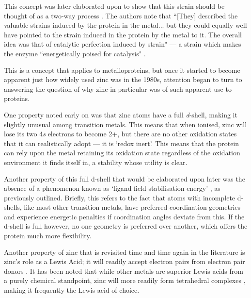 This concept was later elaborated upon to show that this strain should be thought of as a two-way process \cite{williams1985symbiosis}. The authors note that ``[They] described the valuable strains induced by the protein in the metal... but they could equally well have pointed to the strain induced in the protein by the metal to it. The overall idea was that of catalytic perfection induced by strain" --- a strain which makes the enzyme ``energetically poised for catalysis" \cite{vallee1984metallobiochemistry}.

This is a concept that applies to metalloproteins, but once it started to become apparent just how widely used zinc was in the 1980s, attention began to turn to answering the question of why zinc in particular was of such apparent use to proteins.

One property noted early on was that zinc atoms have a full \textit{d}-shell, making it slightly unusual among transition metals\cite{vallee1984metallobiochemistry}. This means that when ionised, zinc will lose its two 4\textit{s} electrons to become 2+, but there are no other oxidation states that it can realistically adopt --- it is `redox inert'. This means that the protein can rely upon the metal retaining its oxidation state regardless of the oxidation environment it finds itself in, a stability whose utility is clear.

Another property of this full d-shell that would be elaborated upon later was the absence of a phenomenon known as `ligand field stabilisation energy' \cite{lachenmann2004zinc,vahrenkamp2007does,maret2009coordination,krkezel2016biological}, as previously outlined. Briefly, this refers to the fact that atoms with incomplete d-shells, like most other transition metals, have preferred coordination geometries and experience energetic penalties if coordination angles deviate from this. If the d-shell is full however, no one geometry is preferred over another, which offers the protein much more flexibility.

Another property of zinc that is revisited time and time again in the literature is zinc's role as a Lewis Acid; it will readily accept electron pairs from electron pair donors \cite{williams1984zinc}. It has been noted that while other metals are superior Lewis acids from a purely chemical standpoint, zinc will more readily form tetrahedral complexes \cite{bertini1985zinc}, making it frequently the Lewis acid of choice.

